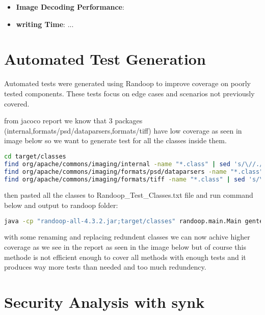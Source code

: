 \documentclass[a4paper,12pt]{report}
\begin{document}
\begin{itemize}
    \item \textbf{Image Decoding Performance}:
    \item \textbf{writing Time}:
    ...
\end{itemize}

\newpage

\chapter{Automated Test Generation}
Automated tests were generated using Randoop to improve coverage on poorly tested components. These tests focus on edge cases and scenarios not previously covered.

from jacoco report we know that 3 packages (internal,formats/psd/dataparsers,formats/tiff) have low coverage as seen in image below so we want to generate test for all the classes inside them.

\begin{lstlisting}[language=bash]
cd target/classes
find org/apache/commons/imaging/internal -name "*.class" | sed 's/\//./g' | sed 's/\.class\$//'
find org/apache/commons/imaging/formats/psd/dataparsers -name "*.class" | sed 's/\//./g' | sed 's/\.class\$//'
find org/apache/commons/imaging/formats/tiff -name "*.class" | sed 's/\//./g' | sed 's/\.class\$//'
\end{lstlisting}

then pasted all the classes to Randoop\_Test\_Classes.txt file and run command below and output to randoop folder:
\begin{lstlisting}[language=bash]
java -cp "randoop-all-4.3.2.jar;target/classes" randoop.main.Main gentests $(Get-Content Randoop_Test_Classes.txt | ForEach-Object \{ "--testclass=$\_"\} ) --time-limit=200 --junit-output-dir=src/test/java/org/apache/commons/imaging/randoop/
\end{lstlisting}
with some renaming and replacing redundent classes we can now achive higher coverage as we see in the report as seen in the image below but of course this methode is not efficient enough to cover all methods with enough tests and it produces way more tests than needed and too much redundency.


\newpage

\chapter{Security Analysis with synk}
\end{document}
